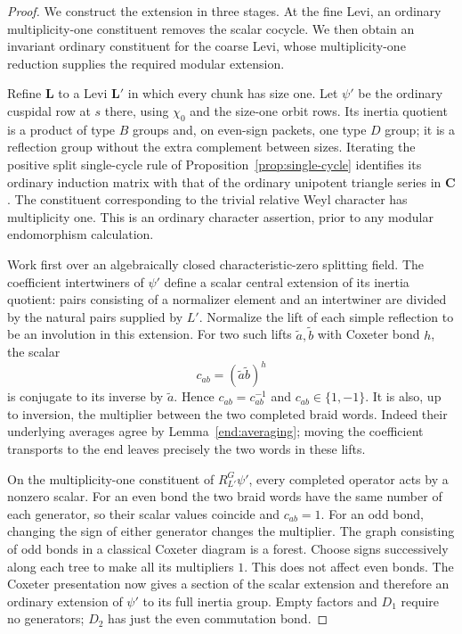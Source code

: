 \begin{proof}
We construct the extension in three stages.  At the fine Levi,
an ordinary multiplicity-one constituent removes the scalar
cocycle.  We then obtain an invariant ordinary constituent for
the coarse Levi, whose multiplicity-one reduction supplies the
required modular extension.

Refine $\mathbf L$ to a Levi $\mathbf L'$ in which every chunk
has size one.  Let $\psi'$ be the ordinary cuspidal row at $s$
there, using $\chi_0$ and the size-one orbit rows.  Its inertia
quotient is a product of type $B$ groups and, on even-sign
packets, one type $D$ group; it is a reflection group without the
extra complement between sizes.  Iterating the positive split
single-cycle rule of Proposition~\ref{prop:single-cycle} identifies
its ordinary induction matrix with that of the ordinary
unipotent triangle series in $\mathbf C$.  The constituent
corresponding to the trivial relative Weyl character has
multiplicity one.  This is an ordinary character assertion, prior
to any modular endomorphism calculation.

Work first over an algebraically closed characteristic-zero
splitting field.  The coefficient intertwiners of $\psi'$ define
a scalar central extension of its inertia quotient: pairs
consisting of a normalizer element and an intertwiner are divided
by the natural pairs supplied by $L'$.  Normalize the lift of
each simple reflection to be an involution in this extension.
For two such lifts $\widetilde a,\widetilde b$ with Coxeter bond
$h$, the scalar
\[
 c_{ab}=(\widetilde a\widetilde b)^h
\]
is conjugate to its inverse by $\widetilde a$.  Hence
$c_{ab}=c_{ab}^{-1}$ and $c_{ab}\in\{1,-1\}$.
It is also, up to inversion, the multiplier between the two
completed braid words.  Indeed their underlying averages agree
by Lemma~\ref{end:averaging}; moving the coefficient transports
to the end leaves precisely the two words in these lifts.

On the multiplicity-one constituent of $R_{L'}^G\psi'$, every
completed operator acts by a nonzero scalar.  For an even bond
the two braid words have the same number of each generator, so
their scalar values coincide and $c_{ab}=1$.  For an odd bond,
changing the sign of either generator changes the multiplier.
The graph consisting of odd bonds in a classical Coxeter diagram
is a forest.  Choose signs successively along each tree to make
all its multipliers $1$.  This does not affect even bonds.
The Coxeter presentation now gives a section of the scalar
extension and therefore an ordinary extension of $\psi'$ to
its full inertia group.  Empty factors and $D_1$ require no
generators; $D_2$ has just the even commutation bond.


\end{proof}
